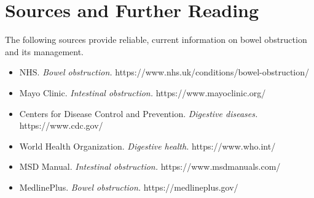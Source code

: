 \section*{Sources and Further Reading}
The following sources provide reliable, current information on bowel obstruction and its management.
\begin{itemize}
    \item NHS. \textit{Bowel obstruction.} https://www.nhs.uk/conditions/bowel-obstruction/
    \item Mayo Clinic. \textit{Intestinal obstruction.} https://www.mayoclinic.org/
    \item Centers for Disease Control and Prevention. \textit{Digestive diseases.} https://www.cdc.gov/
    \item World Health Organization. \textit{Digestive health.} https://www.who.int/
    \item MSD Manual. \textit{Intestinal obstruction.} https://www.msdmanuals.com/
    \item MedlinePlus. \textit{Bowel obstruction.} https://medlineplus.gov/
\end{itemize}
